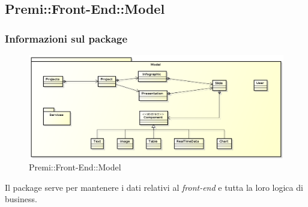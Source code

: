 \subsection{Premi::Front-End::Model}
	\subsubsection{Informazioni sul package}
		\begin{figure}[h]
			\centering
			\includegraphics[width=1.0\linewidth]{img/front-end-package_model}
			\caption[Premi::Front-End::Model]{Premi::Front-End::Model}
		\end{figure}
		Il package serve per mantenere i dati relativi al \textit{front-end} e tutta la loro logica di business.
